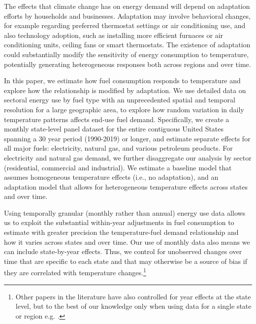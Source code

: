 \documentclass[11pt]{article}
\begin{document}
The effects that climate change has on energy demand will depend on adaptation efforts by households and businesses. Adaptation may involve behavioral changes, for example regarding preferred thermostat settings or air conditioning use, and also technology adoption, such as installing more efficient furnaces or air conditioning units, ceiling fans or smart thermostats. The existence of adaptation could substantially modify the sensitivity of energy consumption to temperature, potentially generating heterogeneous responses both across regions and over time. 

In this paper, we estimate how fuel consumption responds to temperature and explore how the relationship is modified by adaptation. We use detailed data on sectoral energy use by fuel type with an unprecedented spatial and temporal resolution for a large geographic area, to explore how random variation in daily temperature patterns affects end-use fuel demand. Specifically, we create a monthly state-level panel dataset for the entire contiguous United States spanning a 30 year period (1990-2019) or longer, and estimate separate effects for all major fuels: electricity, natural gas, and various petroleum products. For electricity and natural gas demand, we further disaggregate our analysis by sector (residential, commercial and industrial). We estimate a baseline model that assumes homogeneous temperature effects (i.e., no adaptation), and an adaptation model that allows for heterogeneous temperature effects across states and over time. %

Using temporally granular (monthly rather than annual) energy use data allows us to exploit the substantial within-year adjustments in fuel consumption to estimate with greater precision the temperature-fuel demand relationship and how it varies across states and over time. Our use of monthly data also means we can include state-by-year effects. Thus, we control for unobserved changes over time that are specific to each state and that may otherwise be a source of bias if they are correlated with temperature changes.\footnote{ Other papers in the literature have also controlled for year effects at the state level, but to the best of our knowledge only when using data for a single state or region e.g. \cite{auffhammer2022climate}.}   
\end{document}
